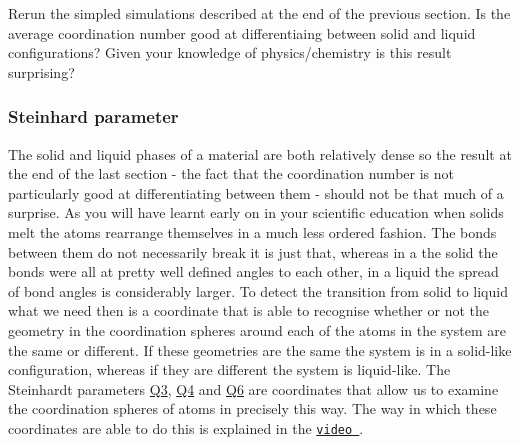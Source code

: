 Rerun the simpled simulations described at the end of the previous section. Is the average coordination number good at differentiaing between solid and liquid configurations? Given your knowledge of physics/chemistry is this result surprising?\hypertarget{belfast-10_steinhardt}{}\subsubsection{Steinhard parameter}\label{belfast-10_steinhardt}
The solid and liquid phases of a material are both relatively dense so the result at the end of the last section -\/ the fact that the coordination number is not particularly good at differentiating between them -\/ should not be that much of a surprise. As you will have learnt early on in your scientific education when solids melt the atoms rearrange themselves in a much less ordered fashion. The bonds between them do not necessarily break it is just that, whereas in a the solid the bonds were all at pretty well defined angles to each other, in a liquid the spread of bond angles is considerably larger. To detect the transition from solid to liquid what we need then is a coordinate that is able to recognise whether or not the geometry in the coordination spheres around each of the atoms in the system are the same or different. If these geometries are the same the system is in a solid-\/like configuration, whereas if they are different the system is liquid-\/like. The Steinhardt parameters \hyperlink{Q3}{Q3}, \hyperlink{Q4}{Q4} and \hyperlink{Q6}{Q6} are coordinates that allow us to examine the coordination spheres of atoms in precisely this way. The way in which these coordinates are able to do this is explained in the \href{https://www.youtube.com/watch?v=ou0uKgK35lE}{\tt video }.

